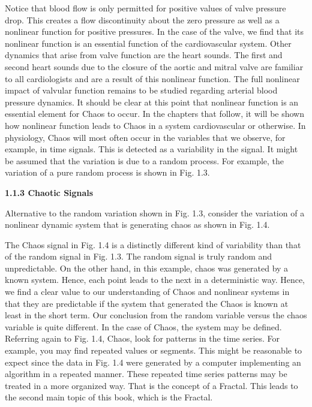 \documentclass{article}
\begin{document}
\hfill


Notice that blood flow is only permitted for positive values of valve pressure
drop. This creates a flow discontinuity about the zero pressure as well as a nonlinear
function for positive pressures. In the case of the valve, we find that its nonlinear function is an essential function of the cardiovascular system. Other dynamics that
arise from valve function are the heart sounds. The first and second heart sounds due
to the closure of the aortic and mitral valve are familiar to all cardiologists and are
a result of this nonlinear function. The full nonlinear impact of valvular function
remains to be studied regarding arterial blood pressure dynamics. It should be clear
at this point that nonlinear function is an essential element for Chaos to occur. In the
chapters that follow, it will be shown how nonlinear function leads to Chaos in a
system cardiovascular or otherwise. In physiology, Chaos will most often occur in
the variables that we observe, for example, in time signals. This is detected as a variability
in the signal. It might be assumed that the variation is due to a random process.
For example, the variation of a pure random process is shown in Fig. 1.3.

\hfill

\textbf{1.1.3 Chaotic Signals}

\hfill

Alternative to the random variation shown in Fig. 1.3, consider the variation of a nonlinear dynamic system that is generating chaos as shown in Fig. 1.4.

\hfill

The Chaos signal in Fig. 1.4 is a distinctly different kind of variability than that
of the random signal in Fig. 1.3. The random signal is truly random and unpredictable.
On the other hand, in this example, chaos was generated by a known system.
Hence, each point leads to the next in a deterministic way. Hence, we find a clear
value to our understanding of Chaos and nonlinear systems in that they are predictable
if the system that generated the Chaos is known at least in the short term. Our
conclusion from the random variable versus the chaos variable is quite different. In
the case of Chaos, the system may be defined. Referring again to Fig. 1.4, Chaos,
look for patterns in the time series. For example, you may find repeated values or
segments. This might be reasonable to expect since the data in Fig. 1.4 were generated
by a computer implementing an algorithm in a repeated manner. These repeated
time series patterns may be treated in a more organized way. That is the concept of
a Fractal. This leads to the second main topic of this book, which is the Fractal.
\end{document}
